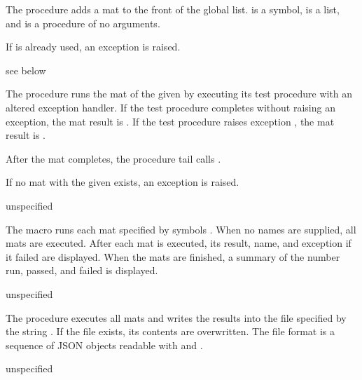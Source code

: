 The  procedure adds a mat to the front of the global
list.  is a symbol,  is a list, and  is
a procedure of no arguments.

If  is already used, an exception is raised.

\begin{procedure}
\end{procedure}
\returns{} see below

The  procedure runs the mat of the given  by
executing its test procedure with an altered exception handler. If the
test procedure completes without raising an exception, the mat result
is . If the test procedure raises exception , the
mat result is .

After the mat completes, the  procedure tail calls
.

If no mat with the given  exists, an exception is raised.

\begin{syntax}
\end{syntax}
\returns{} unspecified

The  macro runs each mat specified by symbols
 \etc.  When no names are supplied, all
mats are executed.  After each mat is executed, its result, name, and
exception if it failed are displayed.  When the mats are finished, a
summary of the number run, passed, and failed is displayed.

\begin{procedure}
\end{procedure}
\returns{} unspecified

The  procedure executes all mats and writes
the results into the file specified by the string . If
the file exists, its contents are overwritten. The file format is a
sequence of JSON objects readable with  and
.

\begin{procedure}
\end{procedure}
\returns{} unspecified

